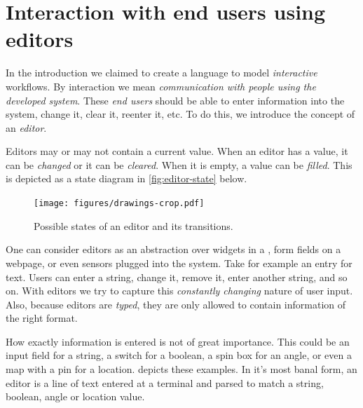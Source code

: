 
\section{Interaction with end users using editors}

In the introduction we claimed to create a language to model \emph{interactive} workflows.
By interaction we mean \emph{communication with people using the developed system}.
These \emph{end users} should be able to enter information into the system,
change it, clear it, reenter it, etc.
To do this, we introduce the concept of an \emph{editor}.

Editors may or may not contain a current value.
When an editor has a value, it can be \emph{changed} or it can be \emph{cleared}.
When it is empty, a value can be \emph{filled}.
This is depicted as a state diagram in \autoref{fig:editor-state} below.

\begin{figure}
  \centering
  \texttt{[image: figures/drawings-crop.pdf]}
  \caption{Possible states of an editor and its transitions.}
  \label{fig:editor-state}
\end{figure}

One can consider editors as an abstraction over widgets in a \GUI,
form fields on a webpage,
or even sensors plugged into the system.
Take for example an entry for text.
Users can enter a string, change it, remove it, enter another string, and so on.
With editors we try to capture this \emph{constantly changing} nature of user input.
Also, because editors are \emph{typed},
they are only allowed to contain information of the right format.

How exactly information is entered is not of great importance.
This could be an input field for a string,
a switch for a boolean,
a spin box for an angle,
or even a map with a pin for a location.
 depicts these examples.
In it's most banal form,
an editor is a line of text entered at a terminal and parsed to match a string, boolean, angle or location value.

